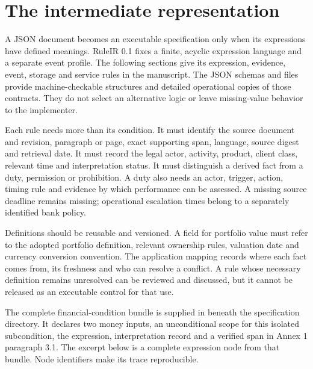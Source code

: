 \section{The intermediate representation}
\label{merge:P-03-product:02}


A JSON document becomes an executable specification only when its expressions
have defined meanings. RuleIR 0.1 fixes a finite, acyclic expression language and
a separate event profile. The following sections give its expression, evidence,
event, storage and service rules in the manuscript. The JSON schemas and
 files provide machine-checkable structures and detailed
operational copies of those contracts. They do not select an alternative logic
or leave missing-value behavior to the implementer.

Each rule needs more than its condition. It must identify the source document and
revision, paragraph or page, exact supporting span, language, source digest and
retrieval date. It must record the legal actor, activity, product, client class,
relevant time and interpretation status. It must distinguish a derived fact from
a duty, permission or prohibition. A duty also needs an actor, trigger, action,
timing rule and evidence by which performance can be assessed. A missing source
deadline remains missing; operational escalation times belong to a separately
identified bank policy.


Definitions should be reusable and versioned. A field for portfolio value must
refer to the adopted portfolio definition, relevant ownership rules, valuation
date and currency conversion convention. The application mapping records where
each fact comes from, its freshness and who can resolve a conflict. A rule whose
necessary definition remains unresolved can be reviewed and discussed, but it
cannot be released as an executable control for that use.

The complete financial-condition bundle is supplied in
 beneath the specification directory.
It declares two money inputs, an unconditional scope for this isolated
subcondition, the expression, interpretation record and a verified span in
Annex 1 paragraph 3.1. The excerpt below is a complete expression node from
that bundle. Node identifiers make its trace reproducible.

